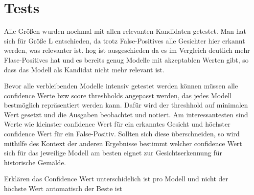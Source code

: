 \chapter{Tests}

Alle Größen wurden nochmal mit allen relevanten Kandidaten getestet. Man hat sich für Größe L entschieden, da trotz False-Positives alle Gesichter hier erkannt werden, was relevanter ist. \gls{hog} ist ausgeschieden da es im Vergleich deutlich mehr Flase-Positives hat und es bereits genug Modelle mit akzeptablen Werten gibt, so dass das Modell als Kandidat nicht mehr relevant ist.

Bevor alle verbleibenden Modelle intensiv getestet werden können müssen alle confidence Werte bzw score threshholds angepasst werden, das jedes Modell bestmöglich repräsentiert werden kann. Dafür wird der threshhold auf minimalen Wert gesetzt und die Ausgaben beobachtet und notiert. Am interessantesten sind Werte wie kleinster confidence Wert für ein erkanntes Gesicht und höchster confidence Wert für ein False-Positiv. Sollten sich diese überschneiden, so wird mithilfe des Kontext der anderen Ergebnisse bestimmt welcher confidence Wert sich für das jeweilige Modell am besten eignet zur Gesichtserkennung für historische Gemälde.

Erklären das Confidence Wert unterschidelich ist pro Modell und nicht der höchste Wert automatisch der Beste ist

